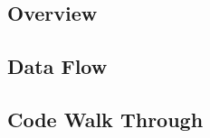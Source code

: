\documentclass[../final.tex]{subfiles}
\begin{document}
\subsection{Overview}
\subsection{Data Flow}
\subsection{Code Walk Through}
\end{document}
